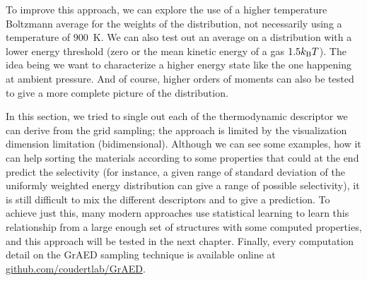 \documentclass[main]{subfiles}
\begin{document}
To improve this approach, we can explore the use of a higher temperature Boltzmann average for the weights of the distribution, not necessarily using a temperature of \SI{900}{\kelvin}. We can also test out an average on a distribution with a lower energy threshold (zero or the mean kinetic energy of a gas $1.5k_{\text{B}}T$). The idea being we want to characterize a higher energy state like the one happening at ambient pressure. And of course, higher orders of moments can also be tested to give a more complete picture of the distribution.

\vspace{2cm}

In this section, we tried to single out each of the thermodynamic descriptor we can derive from the grid sampling; the approach is limited by the visualization dimension limitation (bidimensional). Although we can see some examples, how it can help sorting the materials according to some properties that could at the end predict the selectivity (for instance, a given range of standard deviation of the uniformly weighted energy distribution can give a range of possible selectivity), it is still difficult to mix the different descriptors and to give a prediction. To achieve just this, many modern approaches use statistical learning to learn this relationship from a large enough set of structures with some computed properties, and this approach will be tested in the next chapter. Finally, every computation detail on the GrAED sampling technique is available online at \url{github.com/coudertlab/GrAED}.

\OnlyInSubfile{\printglobalbibliography}
\end{document}
